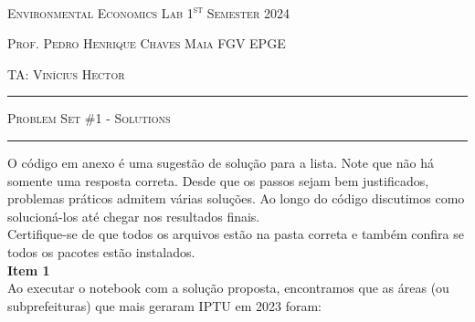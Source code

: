 \documentclass[12pt,a4paper]{article}
\theoremstyle{break}
\begin{document}
    \noindent
    \textsc{Environmental Economics Lab}  
    \textsc{1\textsuperscript{st} Semester 2024}

    \noindent
    \textsc{Prof. Pedro Henrique Chaves Maia}  
    \textsc{FGV EPGE}

    \noindent
    \textsc{TA: Vinícius Hector}
    
    \bigskip
    \hrule

    \begin{center}
        \textsc{Problem Set \#1 - Solutions}
    \end{center}
    \hrule

\bigskip
\bigskip

\indent O código em anexo é uma sugestão de solução para a lista. Note que não há somente uma resposta correta. Desde que os passos sejam bem justificados, problemas práticos admitem várias soluções. Ao longo do código discutimos como solucioná-los até chegar nos resultados finais.\\
\indent Certifique-se de que todos os arquivos estão na pasta correta e também confira se todos os pacotes estão instalados.\\

\textbf{Item 1}\\
\ident Ao executar o notebook com a solução proposta, encontramos que as áreas (ou subprefeituras) que mais geraram IPTU em 2023 foram:\\
\end{document}
